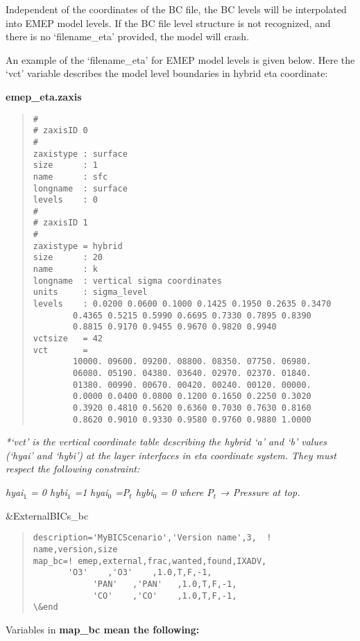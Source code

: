Independent of the coordinates of the BC file, the BC levels will be interpolated into EMEP model levels.  If the BC file level structure is not recognized, and there 	is no `filename\_eta' provided, the model will crash. 

An example of the `filename\_eta' for EMEP model levels is given below. Here the `vct' variable describes the model level boundaries in hybrid eta coordinate: 	

\bf emep\_eta.zaxis
\begin{quote}
\begin{verbatim}
# 
# zaxisID 0 
# 
zaxistype : surface 
size      : 1 
name      : sfc 
longname  : surface 
levels    : 0 
# 
# zaxisID 1 
# 
zaxistype = hybrid 
size      : 20 
name      : k 
longname  : vertical sigma coordinates 
units     : sigma_level 
levels    : 0.0200 0.0600 0.1000 0.1425 0.1950 0.2635 0.3470 
	    0.4365 0.5215 0.5990 0.6695 0.7330 0.7895 0.8390 
	    0.8815 0.9170 0.9455 0.9670 0.9820 0.9940 
vctsize   = 42 
vct       =
	    10000. 09600. 09200. 08800. 08350. 07750. 06980. 
	    06080. 05190. 04380. 03640. 02970. 02370. 01840. 
	    01380. 00990. 00670. 00420. 00240. 00120. 00000. 
	    0.0000 0.0400 0.0800 0.1200 0.1650 0.2250 0.3020 
	    0.3920 0.4810 0.5620 0.6360 0.7030 0.7630 0.8160 
	    0.8620 0.9010 0.9330 0.9580 0.9760 0.9880 1.0000 
\end{verbatim}
\end{quote}


\textit {*`vct' is the vertical coordinate table describing the hybrid `a' and `b' values (`hyai' and `hybi') at the layer interfaces in eta coordinate system.  They must respect the following constraint:} 

\textit{hyai$_{1}$ = 0    hybi${_1}$ =1}
\newline
\textit{hyai${_0}$ =P${_t}$   hybi${_0}$ = 0}
\newline
\textit{where P${_t}$ → Pressure at top.}
\newline

\&ExternalBICs\_bc
\begin{quote}
\begin{verbatim}
description='MyBICScenario','Version name',3,  ! name,version,size 
map_bc=! emep,external,frac,wanted,found,IXADV, 
  	   'O3'    ,'O3'    ,1.0,T,F,-1, 
	      	'PAN'   ,'PAN'   ,1.0,T,F,-1, 
	      	'CO'    ,'CO'    ,1.0,T,F,-1, 
\&end 
\end{verbatim}
\end{quote}

Variables in \bf {map\_bc} mean the following: 

